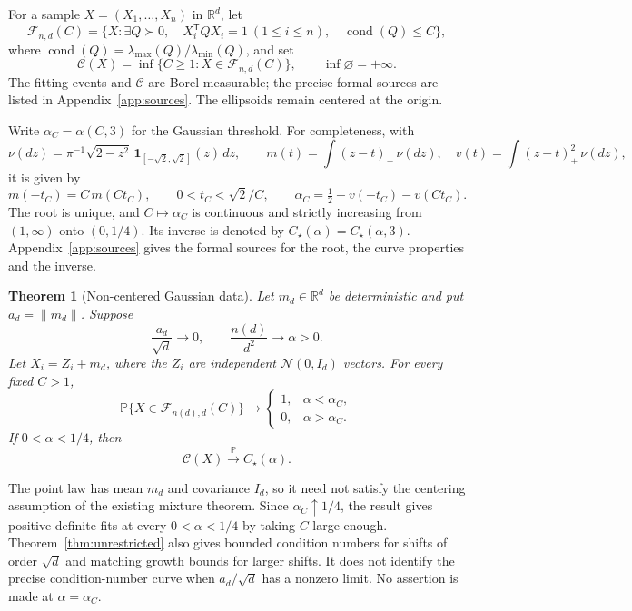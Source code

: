 \documentclass[11pt]{article}
\newcommand{\R}{\mathbb R}
\newcommand{\Pbb}{\mathbb P}
\DeclareMathOperator{\cond}{cond}
\newcommand{\norm}[1]{\lVert#1\rVert}
\newcommand{\Fit}{\mathcal F}
\newcommand{\Copt}{\mathcal C}
\newtheorem{theorem}{Theorem}[section]
\theoremstyle{remark}
\begin{document}
For a sample $X=(X_1,\ldots,X_n)$ in $\R^d$, let
\[
 \Fit_{n,d}(C)=\{X:\exists Q\succ0,\quad
       X_i^{\mathsf T}QX_i=1\ (1\le i\le n),\quad \cond(Q)\le C\},
\]
where $\cond(Q)=\lambda_{\max}(Q)/\lambda_{\min}(Q)$, and set
\[
 \Copt(X)=\inf\{C\ge1:X\in\Fit_{n,d}(C)\},\qquad \inf\varnothing=+\infty.
\]
The fitting events and $\Copt$ are Borel measurable; the precise formal
sources are listed in Appendix~\ref{app:sources}. The ellipsoids remain
centered at the origin.

Write $\alpha_C=\alpha(C,3)$ for the Gaussian threshold. For completeness,
with
\[
 \nu(dz)=\pi^{-1}\sqrt{2-z^2}\,
       \mathbf1_{[-\sqrt2,\sqrt2]}(z)\,dz,\qquad
 m(t)=\int(z-t)_+\,\nu(dz),\quad v(t)=\int(z-t)_+^2\,\nu(dz),
\]
it is given by
\begin{equation}\label{eq:curve}
 m(-t_C)=C\,m(Ct_C),\qquad
 0<t_C<\sqrt2/C,\qquad
 \alpha_C=\tfrac12-v(-t_C)-v(Ct_C).
\end{equation}
The root is unique, and $C\mapsto\alpha_C$ is continuous and strictly
increasing from $(1,\infty)$ onto $(0,1/4)$. Its inverse is denoted by
$C_\star(\alpha)=C_\star(\alpha,3)$. Appendix~\ref{app:sources} gives
the formal sources for the root, the curve properties and the inverse.

\begin{theorem}[Non-centered Gaussian data]\label{thm:shifted}
Let $m_d\in\R^d$ be deterministic and put $a_d=\norm{m_d}$.
Suppose
\begin{equation}\label{eq:growth}
 \frac{a_d}{\sqrt d}\longrightarrow0,
 \qquad \frac{n(d)}{d^2}\longrightarrow\alpha>0.
\end{equation}
Let $X_i=Z_i+m_d$, where the $Z_i$ are independent
$\mathcal N(0,I_d)$ vectors. For every fixed $C>1$,
\begin{equation}\label{eq:threshold}
 \Pbb\{X\in\Fit_{n(d),d}(C)\}\longrightarrow
 \begin{cases}
  1,&\alpha<\alpha_C,\\
  0,&\alpha>\alpha_C.
 \end{cases}
\end{equation}
If $0<\alpha<1/4$, then
\begin{equation}\label{eq:optimum}
 \Copt(X)\xrightarrow{\Pbb}C_\star(\alpha).
\end{equation}
\end{theorem}

The point law has mean $m_d$ and covariance $I_d$, so it need not
satisfy the centering assumption of the existing mixture theorem.
Since $\alpha_C\uparrow1/4$, the result gives positive definite fits
at every $0<\alpha<1/4$ by taking $C$ large enough. Theorem~\ref{thm:unrestricted}
also gives bounded condition numbers for shifts of order $\sqrt d$ and
matching growth bounds for larger shifts. It does not identify the
precise condition-number curve when $a_d/\sqrt d$ has a nonzero limit.
No assertion is made at $\alpha=\alpha_C$.
\end{document}
